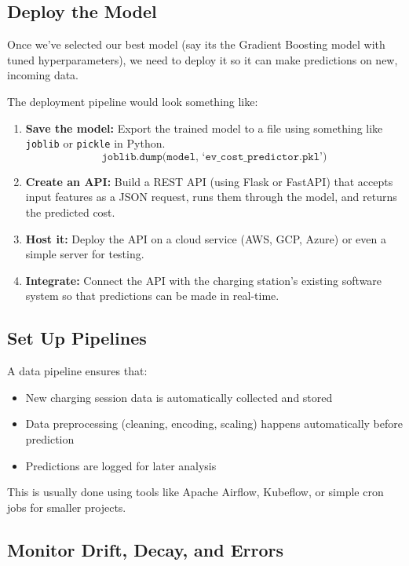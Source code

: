 \documentclass[12pt, a4paper]{article}
\begin{document}
\subsection{Deploy the Model}

Once we've selected our best model (say its the Gradient Boosting model with tuned hyperparameters), we need to deploy it so it can make predictions on new, incoming data.

The deployment pipeline would look something like:

\begin{enumerate}
    \item \textbf{Save the model:} Export the trained model to a file using something like \texttt{joblib} or \texttt{pickle} in Python.
    $$\texttt{joblib.dump(model, `ev\_cost\_predictor.pkl')}$$
    
    \item \textbf{Create an API:} Build a REST API (using Flask or FastAPI) that accepts input features as a JSON request, runs them through the model, and returns the predicted cost.
    
    \item \textbf{Host it:} Deploy the API on a cloud service (AWS, GCP, Azure) or even a simple server for testing.
    
    \item \textbf{Integrate:} Connect the API with the charging station's existing software system so that predictions can be made in real-time.
\end{enumerate}

\subsection{Set Up Pipelines}

A data pipeline ensures that:
\begin{itemize}
    \item New charging session data is automatically collected and stored
    \item Data preprocessing (cleaning, encoding, scaling) happens automatically before prediction
    \item Predictions are logged for later analysis
\end{itemize}

This is usually done using tools like Apache Airflow, Kubeflow, or simple cron jobs for smaller projects.

\subsection{Monitor Drift, Decay, and Errors}
\end{document}
